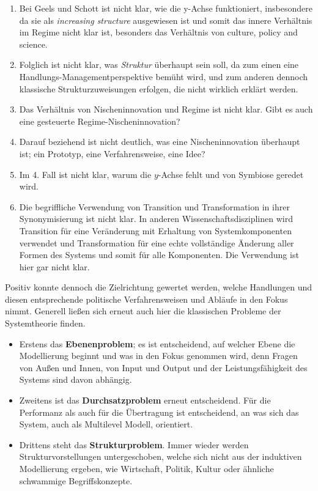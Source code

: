 \documentclass[11pt,a4paper]{article}
\begin{document}
\begin{enumerate}
\item Bei Geels und Schott ist nicht klar, wie die y-Achse funktioniert,
  insbesondere da sie als \emph{increasing structure} ausgewiesen ist und
  somit das innere Verhältnis im Regime nicht klar ist, besonders das
  Verhältnis von culture, policy and science.
\item Folglich ist nicht klar, was \emph{Struktur} überhaupt sein soll, da zum
  einen eine Handlungs-Managementperspektive bemüht wird, und zum anderen
  dennoch klassische Strukturzuweisungen erfolgen, die nicht wirklich erklärt
  werden.
\item Das Verhältnis von Nischeninnovation und Regime ist nicht klar. Gibt es
  auch eine gesteuerte Regime-Nischeninnovation?
\item Darauf beziehend ist nicht deutlich, was eine Nischeninnovation
  überhaupt ist; ein Prototyp, eine Verfahrensweise, eine Idee?
\item Im 4. Fall ist nicht klar, warum die $y$-Achse fehlt und von Symbiose
  geredet wird.
\item Die begriff\-liche Verwendung von Transition und Transformation in ihrer
  Synonymisierung ist nicht klar. In anderen Wissenschaftsdisziplinen wird
  Transition für eine Veränderung mit Erhaltung von Systemkomponenten
  verwendet und Transformation für eine echte vollständige Änderung aller
  Formen des Systems und somit für alle Komponenten. Die Verwendung ist hier
  gar nicht klar.
\end{enumerate}

Positiv konnte dennoch die Zielrichtung gewertet werden, welche Handlungen und
diesen entsprechende politische Verfahrensweisen und Abläufe in den Fokus
nimmt. Generell ließen sich erneut auch hier die klassischen Probleme der
Systemtheorie finden. 
\begin{itemize}
\item Erstens das \textbf{Ebenenproblem}; es ist entscheidend, auf welcher
  Ebene die Modellierung beginnt und was in den Fokus genommen wird, denn
  Fragen von Außen und Innen, von Input und Output und der Leistungsfähigkeit
  des Systems sind davon abhängig.
\item Zweitens ist das \textbf{Durchsatzproblem} erneut entscheidend. Für die
  Performanz als auch für die Übertragung ist entscheidend, an was sich das
  System, auch als Multilevel Modell, orientiert.
\item Drittens steht das \textbf{Strukturproblem}. Immer wieder werden
  Strukturvorstellungen untergeschoben, welche sich nicht aus der induktiven
  Modellierung ergeben, wie Wirtschaft, Politik, Kultur oder ähnliche
  schwammige Begriffskonzepte.
\end{itemize}
\end{document}
